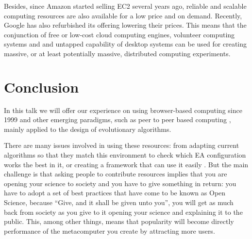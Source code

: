 \documentclass[a4paper]{article}
\begin{document}
Besides, since Amazon started selling EC2 several years ago, reliable and scalable computing resources are also available for a low price and on demand. Recently, Google has also refurbished its offering lowering their prices. This means that the conjunction of free or low-cost cloud computing engines, volunteer computing systems and and untapped capability of desktop systems can be used for creating massive, or at least potentially massive, distributed computing experiments.

\section{Conclusion}

In this talk we will offer our experience on using browser-based computing since 1999 \cite{jesusIWANN99} and other emerging paradigms, such as peer to peer based computing \cite{evag:gpem}, mainly applied to the design of evolutionary algorithms. 

There are many issues involved in using these resources: from adapting current algorithms so that they match this environment \cite{agajaj} to check which EA configuration works the best in it, or creating a framework that can use it easily \cite{nodeo2014}. But the main challenge is that asking people to contribute resources implies that you are opening your science to society and you have to give something in return: you have to adopt a set of best practices that have come to be known as Open Science, because ``Give, and it shall be given unto you'', you will get as much back from society as you give to it opening your science and explaining it to the public. This, among other things, means that popularity will become directly performance of the metacomputer you create by attracting more users.




\end{document}
